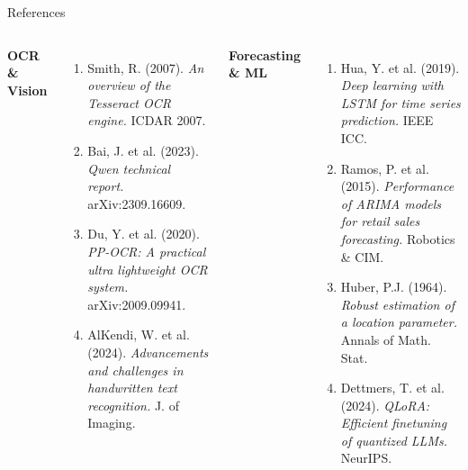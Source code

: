 \documentclass[10pt]{beamer}
\begin{document}
\begin{frame}{References}
    \tiny
    \begin{columns}[T]
        \textbf{OCR \& Vision}
        \begin{enumerate}
            \item[{[9]}] Smith, R. (2007). \textit{An overview of the Tesseract OCR engine.} ICDAR 2007.
            \item[{[33]}] Bai, J. et al. (2023). \textit{Qwen technical report.} arXiv:2309.16609.
            \item[{[34]}] Du, Y. et al. (2020). \textit{PP-OCR: A practical ultra lightweight OCR system.} arXiv:2009.09941.
            \item[{[23]}] AlKendi, W. et al. (2024). \textit{Advancements and challenges in handwritten text recognition.} J. of Imaging.
        \end{enumerate}
        \vspace{0.15cm}
        \textbf{Forecasting \& ML}
        \begin{enumerate}
            \item[{[5]}] Hua, Y. et al. (2019). \textit{Deep learning with LSTM for time series prediction.} IEEE ICC.
            \item[{[12]}] Ramos, P. et al. (2015). \textit{Performance of ARIMA models for retail sales forecasting.} Robotics \& CIM.
            \item[{[35]}] Huber, P.J. (1964). \textit{Robust estimation of a location parameter.} Annals of Math. Stat.
            \item[{[36]}] Dettmers, T. et al. (2024). \textit{QLoRA: Efficient finetuning of quantized LLMs.} NeurIPS.
        \end{enumerate}


\end{columns}
\end{frame}
\end{document}
